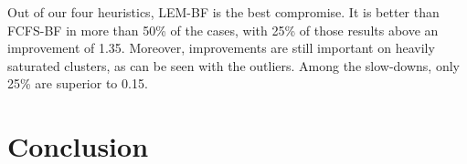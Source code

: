 \documentclass[conference,10pt]{IEEEtran}
\begin{document}
Out of our four heuristics, LEM-BF is the best compromise.
It is better than FCFS-BF in more than 50\% of the cases, 
with 25\% of those results above an improvement of 1.35.
Moreover, improvements are still important on heavily saturated clusters, as can be seen with the outliers.
Among the slow-downs, only 25\% are superior to 0.15.


\section{Conclusion}\label{sec.conclusion}




\end{document}
